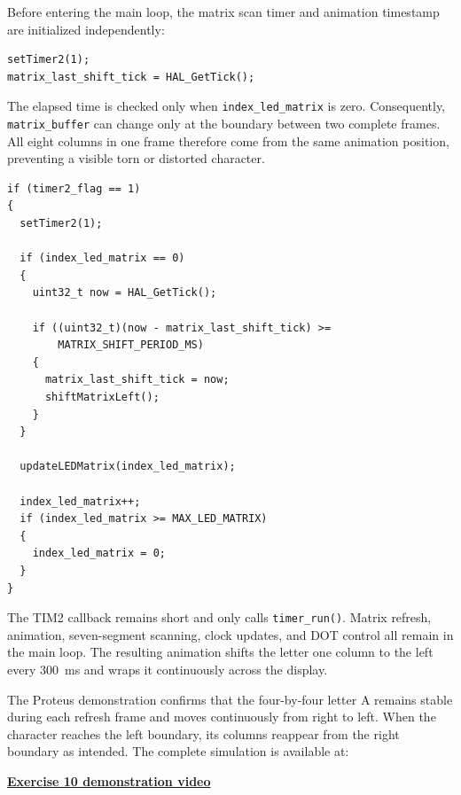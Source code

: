 Before entering the main loop, the matrix scan timer and animation timestamp
are initialized independently:

\begin{lstlisting}[caption={Initialization of matrix scanning and movement timing}]
setTimer2(1);
matrix_last_shift_tick = HAL_GetTick();
\end{lstlisting}

The elapsed time is checked only when \texttt{index\_led\_matrix} is zero.
Consequently, \texttt{matrix\_buffer} can change only at the boundary between
two complete frames. All eight columns in one frame therefore come from the
same animation position, preventing a visible torn or distorted character.

\begin{lstlisting}[caption={Frame-synchronized animation in the main loop}]
if (timer2_flag == 1)
{
  setTimer2(1);

  if (index_led_matrix == 0)
  {
    uint32_t now = HAL_GetTick();

    if ((uint32_t)(now - matrix_last_shift_tick) >=
        MATRIX_SHIFT_PERIOD_MS)
    {
      matrix_last_shift_tick = now;
      shiftMatrixLeft();
    }
  }

  updateLEDMatrix(index_led_matrix);

  index_led_matrix++;
  if (index_led_matrix >= MAX_LED_MATRIX)
  {
    index_led_matrix = 0;
  }
}
\end{lstlisting}

The TIM2 callback remains short and only calls \texttt{timer\_run()}. Matrix
refresh, animation, seven-segment scanning, clock updates, and DOT control all
remain in the main loop. The resulting animation shifts the letter one column
to the left every \SI{300}{ms} and wraps it continuously across the display.

The Proteus demonstration confirms that the four-by-four letter A remains
stable during each refresh frame and moves continuously from right to left.
When the character reaches the left boundary, its columns reappear from the
right boundary as intended. The complete simulation is available at:
\begin{center}
    \href{https://github.com/quangnguyencomeng/CO3009-261-CC-2453052/blob/main/Lab/lab_reports/source/vids/lab2_ex10.mp4}{\textbf{Exercise 10 demonstration video}}
\end{center}

\endinput




